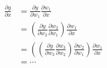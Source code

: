 \documentclass[a4paper,12pt]{article}
\newcommand*{\prv}[1]{\partial #1}
\newcommand*{\prw}[1]{\partial w_{#1}}
\begin{document}
    \begin{align*}
        \frac{\prv{y}}{\prv{x}}&=\frac{\prv{y}}{\prw{1}}\frac{\prw{1}}{\prv{x}}\\
        &=\left(\frac{\prv{y}}{\prw{2}}\frac{\prw{2}}{\prw{1}}\right)\frac{\prw{1}}{\prv{x}}\\
        &=\left(\left(\frac{\prv{y}}{\prw{3}}\frac{\prw{3}}{\prw{2}}\right)\frac{\prw{2}}{\prw{1}}\right)\frac{\prw{1}}{\prv{x}}\\
        &=\cdots
    \end{align*}
\end{document}
